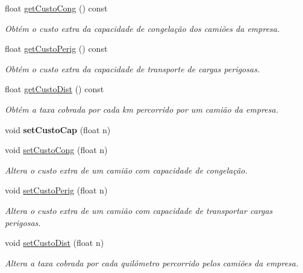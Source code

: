 \begin{DoxyCompactItemize}
\item 
float \hyperlink{class_empresa_ad13572d5f1cd219eac3c5a67ed0cd77f}{get\+Custo\+Cong} () const 
\begin{DoxyCompactList}\small\item\em Obtém o custo extra da capacidade de congelação dos camiões da empresa. \end{DoxyCompactList}\item 
float \hyperlink{class_empresa_a5c0286d07ea42c5d818f8b18aa530d06}{get\+Custo\+Perig} () const 
\begin{DoxyCompactList}\small\item\em Obtém o custo extra da capacidade de transporte de cargas perigosas. \end{DoxyCompactList}\item 
float \hyperlink{class_empresa_a5fff95aab4d58e80e739de0baa473245}{get\+Custo\+Dist} () const 
\begin{DoxyCompactList}\small\item\em Obtém a taxa cobrada por cada km percorrido por um camião da empresa. \end{DoxyCompactList}\item 
\hypertarget{class_empresa_a8f6ad48850f190224c912824fc760aed}{}void {\bfseries set\+Custo\+Cap} (float n)\label{class_empresa_a8f6ad48850f190224c912824fc760aed}

\item 
void \hyperlink{class_empresa_a5e83a7a3a3a19b597c2bd17f16ec0bbb}{set\+Custo\+Cong} (float n)
\begin{DoxyCompactList}\small\item\em Altera o custo extra de um camião com capacidade de congelação. \end{DoxyCompactList}\item 
void \hyperlink{class_empresa_a8a467aca65f03f7dcf4b745923567f7d}{set\+Custo\+Perig} (float n)
\begin{DoxyCompactList}\small\item\em Altera o custo extra de um camião com capacidade de transportar cargas perigosas. \end{DoxyCompactList}\item 
void \hyperlink{class_empresa_abe767c7e1ce6e087197e1c215585613c}{set\+Custo\+Dist} (float n)
\begin{DoxyCompactList}\small\item\em Altera a taxa cobrada por cada quilómetro percorrido pelos camiões da empresa. \end{DoxyCompactList}\end{DoxyCompactItemize}


